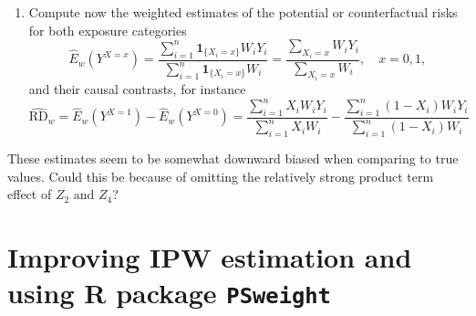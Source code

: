 \documentclass[
]{book}
\newenvironment{Shaded}{\begin{snugshade}}{\end{snugshade}}
\newcommand{\DecValTok}[1]{\textcolor[rgb]{0.00,0.00,0.81}{#1}}
\newcommand{\FunctionTok}[1]{\textcolor[rgb]{0.13,0.29,0.53}{\textbf{#1}}}
\newcommand{\NormalTok}[1]{#1}
\newcommand{\OtherTok}[1]{\textcolor[rgb]{0.56,0.35,0.01}{#1}}
\newcommand{\SpecialCharTok}[1]{\textcolor[rgb]{0.81,0.36,0.00}{\textbf{#1}}}
\providecommand{\tightlist}{%
  \setlength{\itemsep}{0pt}\setlength{\parskip}{0pt}}
\begin{document}
\begin{enumerate}
\def\labelenumi{\arabic{enumi}.}
\setcounter{enumi}{3}
\tightlist
\item
  Compute now the weighted estimates of the
  potential or counterfactual risks for
  both exposure categories
  \[ \widehat{E}_w(Y^{X = x}) =
  \frac{ \sum_{i=1}^n {\mathbf 1}_{ \{X_i=x\} } W_i Y_i }
     {\sum_{i=1}^n {\mathbf 1}_{ \{X_i=x\} }W_i} =
   \frac{ \sum_{X_i = x} W_i Y_i }{\sum_{X_i=x} W_i}, \quad x = 0,1, \]
  and their causal contrasts, for instance
  \[ \widehat{\text{RD}}_{w} = \widehat{E}_w(Y^{X = 1}) -
                \widehat{E}_w(Y^{X = 0})
    =  \frac{ \sum_{i=1}^n X_i W_i Y_i }{\sum_{i=1}^n X_i W_i} -
    \frac{ \sum_{i=1}^n (1-X_i) W_i Y_i }{\sum_{i=1}^n (1-X_i) W_i}
  \]
\end{enumerate}

\begin{Shaded}
\end{Shaded}

These estimates seem to be somewhat downward biased when
comparing to
true values. Could this be because of omitting
the relatively strong
product term effect of \(Z_2\) and \(Z_4\)?

\section{\texorpdfstring{Improving IPW estimation and using R package \texttt{PSweight}}{Improving IPW estimation and using R package PSweight}}\label{improving-ipw-estimation-and-using-r-package-psweight}
\end{document}
